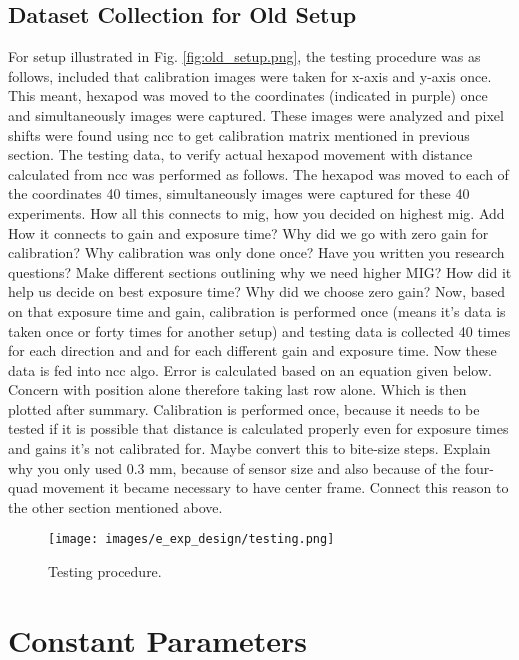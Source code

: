 \subsection*{Dataset Collection for Old Setup}
For setup illustrated in Fig. \ref{fig:old_setup.png}, the testing procedure was as follows, included that calibration images were taken for x-axis and y-axis once. This meant, hexapod was moved to the coordinates (indicated in purple) once and simultaneously images were captured. These images were analyzed and pixel shifts were found using \gls{ncc} to get calibration matrix mentioned in previous section. The testing data, to verify actual hexapod movement with distance calculated from \gls{ncc} was performed as follows. The hexapod was moved to each of the coordinates 40 times, simultaneously images were captured for these 40 experiments. How all this connects to \gls{mig}, how you decided on highest \gls{mig}. Add How it connects to gain and exposure time? Why did we go with zero gain for calibration? Why calibration was only done once? Have you written you research questions? Make different sections outlining why we need higher MIG? How did it help us decide on best exposure time? Why did we choose zero gain? Now, based on that exposure time and gain, calibration is performed once (means it's data is taken once or forty times for another setup) and testing data is collected 40 times for each direction and and for each different gain and exposure time. Now these data is fed into ncc algo. Error is calculated based on an equation given below. Concern with position alone therefore taking last row alone. Which is then plotted after summary. Calibration is performed once, because it needs to be tested if it is possible that distance is calculated properly even for exposure times and gains it's not calibrated for. Maybe convert this to bite-size steps. Explain why you only used 0.3 mm, because of sensor size and also because of the four-quad movement it became necessary to have center frame. Connect this reason to the other section mentioned above. 
\begin{figure}[h]
    \centering
    \texttt{[image: images/e\_exp\_design/testing.png]}
    \caption{Testing procedure.}
    \label{fig:testing.png}
\end{figure}

\section{Constant Parameters}\label{section:constant_parameters}

